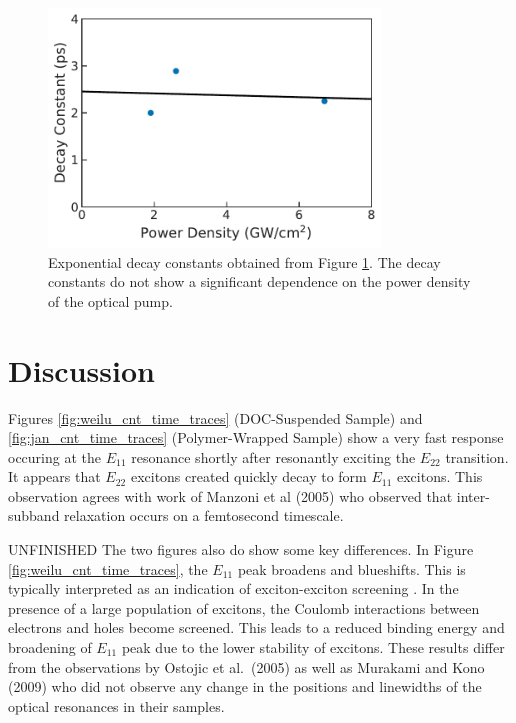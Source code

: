 \clearpage

\begin{figure}[ht]
	\centering
	\includegraphics[height=2.5in]{images/chapter_my_data/Jan_CNT_decay_const_fit}
	\caption{Exponential decay constants obtained from Figure \ref{fig:jan_cnt_decay_const}. The decay constants do not show a significant dependence on the power density of the optical pump. }
	\label{fig:jan_cnt_decay_const}
\end{figure}

\section{Discussion}

Figures \ref{fig:weilu_cnt_time_traces} (DOC-Suspended Sample) and \ref{fig:jan_cnt_time_traces} (Polymer-Wrapped Sample) show a very fast response occuring at the $E_{11}$ resonance shortly after resonantly exciting the $E_{22}$ transition. It appears that $E_{22}$ excitons created quickly decay to form $E_{11}$ excitons. This observation agrees with work of Manzoni et al (2005) who observed that inter-subband relaxation occurs on a femtosecond timescale.

{\color{red} UNFINISHED} The two figures also do show some key differences. In Figure \ref{fig:weilu_cnt_time_traces}, the $E_{11}$ peak broadens and blueshifts. This is typically interpreted as an indication of exciton-exciton screening \cite{shah1996ultrafast}. In the presence of a large population of excitons, the Coulomb interactions between electrons and holes become screened. This leads to a reduced binding energy and broadening of $E_{11}$ peak due to the lower stability of excitons. These results differ from the observations by Ostojic et al.\ (2005) as well as Murakami and Kono (2009) who did not observe any change in the positions and linewidths of the optical resonances in their samples.

